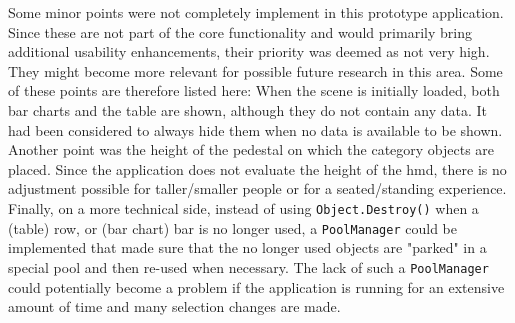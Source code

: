 Some minor points were not completely implement in this prototype application. Since these are not part of the core functionality and would primarily bring additional usability enhancements, their priority was deemed as not very high. They might become more relevant for possible future research in this area. Some of these points are therefore listed here: \newline
When the scene is initially loaded, both bar charts and the table are shown, although they do not contain any data. It had been considered to always hide them when no data is available to be shown. Another point was the height of the pedestal on which the category objects are placed. Since the application does not evaluate the height of the \gls{hmd}, there is no adjustment possible for taller/smaller people or for a seated/standing experience. Finally, on a more technical side, instead of using \texttt{Object.Destroy()} when a (table) row, or (bar chart) bar is no longer used, a \texttt{PoolManager} could be implemented that made sure that the no longer used objects are "parked" in a special pool and then re-used when necessary. The lack of such a \texttt{PoolManager} could potentially become a problem if the application is running for an extensive amount of time and many selection changes are made.





